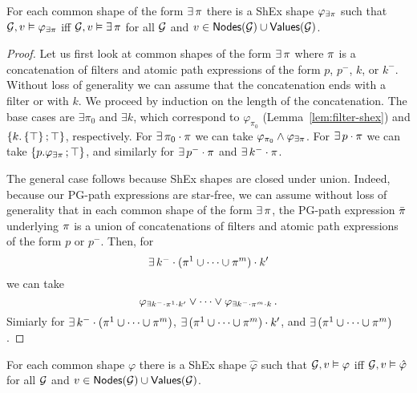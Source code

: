 \begin{lemma}
\label{lem:paths-shex}
For each common shape of the form $\exists\,\pi$ there is a ShEx shape $\varphi_{\exists\pi}$ such that $\mathcal{G}, v\vDash \varphi_{\exists\pi}$ iff $\mathcal{G},v\vDash \exists\, \pi$ for all $\mathcal{G}$ and $v\in\mathsf{Nodes}(\mathcal{G}) \cup \mathsf{Values}(\mathcal{G})$. 
\end{lemma}

\begin{proof}
Let us first look at common shapes of the form $\exists\,\pi$ where $\pi$ is a concatenation of filters and atomic path expressions of the form  $p$, $p^{-}$, $k$, or $k^{-}$. Without loss of generality we can assume that the concatenation ends with a filter or with $k$.
We proceed by induction on the length of the concatenation. The base cases are $\exists \pi_0$ and $\exists k$, which correspond to $\varphi_{\pi_0}$ (Lemma~\ref{lem:filter-shex}) and $\left\{ k.\left\{ \top \right\} \mathop{;} \top \right\} $, respectively.
For $\exists\, \pi_0\cdot\pi$ we can take $\varphi_{\pi_0} \land \varphi_{\exists \pi}$. 
For $\exists\, p\cdot\pi$ we can take $\left\{ p.\varphi_{\exists \pi} \mathop{;} \top \right\}$, and similarly for $\exists\, p^{-}\cdot\pi$ and $\exists\, k^{-}\cdot\pi$. 

The general case follows because ShEx shapes are closed under union. Indeed, because our PG-path expressions are star-free, we can assume without loss of generality that in each common shape of the form $\exists\, \pi$, the PG-path expression $\bar{\pi}$ underlying $\pi$ is a union of concatenations of filters and atomic path expressions of the form $p$ or $p^{-}$. Then, for \[\exists\, k^{-}\cdot(\pi^1 \cup \dots \cup\pi^m)\cdot k'\] we can take \[\varphi_{\exists k^{-}\cdot\pi^1\cdot k'} \lor \dots \lor \varphi_{\exists k^{-}\cdot\pi^m\cdot k}\,.\] Simiarly for $\exists\, k^{-}\cdot(\pi^1 \cup \dots \cup\pi^m)$, $\exists\, (\pi^1 \cup \dots \cup\pi^m)\cdot k'$, and $\exists\, (\pi^1 \cup \dots \cup\pi^m)$.
\end{proof}


\begin{lemma}
\label{lem:shapes-shex}
For each common shape $\varphi$ there is a ShEx shape $\hat \varphi$ such that  $\mathcal{G}, v\vDash \varphi$ iff $\mathcal{G},v\vDash \hat \varphi$ for all $\mathcal{G}$ and $v\in\mathsf{Nodes}(\mathcal{G})  \cup \mathsf{Values}(\mathcal{G})$. 
\end{lemma}

